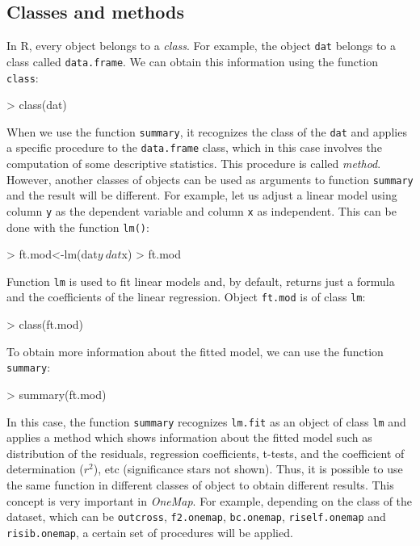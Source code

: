 \documentclass[letterpaper,12pt,oneside]{article}
\begin{document}
\subsection{Classes and methods}

In R, every object belongs to a {\it class}. For example, the object {\tt dat} belongs to a class called {\tt data.frame}. We can obtain this information using the function {\tt class}:

\begin{Schunk}
\begin{Sinput}
> class(dat)
\end{Sinput}
\end{Schunk}

When we use the function {\tt summary}, it recognizes the class of the {\tt dat} and applies a specific procedure to the {\tt data.frame} class, which in this case involves the computation of some descriptive statistics. This procedure is called {\it method}. However, another classes of objects can be used as arguments to function {\tt summary} and the result will be different. For example, let us adjust a linear model using column {\tt y} as the dependent variable and column {\tt x} as independent. This can be done with the function {\tt lm()}:

\begin{Schunk}
\begin{Sinput}
> ft.mod<-lm(dat$y~dat$x)
> ft.mod
\end{Sinput}
\end{Schunk}

Function {\tt lm} is used to fit linear models and, by default, returns just a formula and the coefficients of the linear regression. Object {\tt ft.mod} is of class {\tt lm}:

\begin{Schunk}
\begin{Sinput}
> class(ft.mod)
\end{Sinput}
\end{Schunk}

To obtain more information about the fitted model, we can use the function {\tt summary}:

\begin{Schunk}
\begin{Sinput}
> summary(ft.mod)
\end{Sinput}
\end{Schunk}

In this case, the function {\tt summary} recognizes {\tt lm.fit} as an object of class {\tt lm} and applies a method which shows information about the fitted model such as distribution of the residuals, regression coefficients, t-tests, and the coefficient of determination ($r^2$), etc (significance stars not shown). Thus, it is possible to use the same function in different classes of object to obtain different results. This concept is very important in {\it OneMap}. For example, depending on the class of the dataset, which can be {\tt outcross}, {\tt f2.onemap}, {\tt bc.onemap}, {\tt riself.onemap} and {\tt risib.onemap}, a certain set of procedures will be applied.
\end{document}
